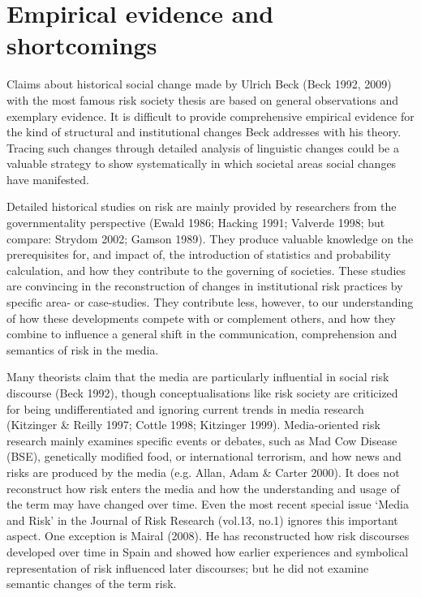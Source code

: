 \section{Empirical evidence and shortcomings}

Claims about historical social change made by Ulrich Beck (Beck 1992, 2009) with the most famous risk society thesis are based on general observations and exemplary evidence. It is difficult to provide comprehensive empirical evidence for the kind of structural and institutional changes Beck addresses with his theory. Tracing such changes through detailed analysis of linguistic changes could be a valuable strategy to show systematically in which societal areas social changes have manifested.

Detailed historical studies on risk are mainly provided by researchers from the governmentality perspective (Ewald 1986; Hacking 1991; Valverde 1998; but compare: Strydom 2002; Gamson 1989). They produce valuable knowledge on the prerequisites for, and impact of, the introduction of statistics and probability calculation, and how they contribute to the governing of societies. These studies are convincing in the reconstruction of changes in institutional risk practices by specific area- or case-studies. They contribute less, however, to our understanding of how these developments compete with or complement others, and how they combine to influence a general shift in the communication, comprehension and semantics of risk in the media.

Many theorists claim that the media are particularly influential in social risk discourse (Beck 1992), though conceptualisations like risk society are criticized for being undifferentiated and ignoring current trends in media research (Kitzinger \& Reilly 1997; Cottle 1998; Kitzinger 1999). Media-oriented risk research mainly examines specific events or debates, such as Mad Cow Disease (BSE), genetically modified food, or international terrorism, and how news and risks are produced by the media (e.g. Allan, Adam \& Carter 2000). It does not reconstruct how risk enters the media and how the understanding and usage of the term may have changed over time. Even the most recent special issue `Media and Risk' in the Journal of Risk Research (vol.13, no.1) ignores this important aspect. One exception is Mairal (2008). He has reconstructed how risk discourses developed over time in Spain and showed how earlier experiences and symbolical representation of risk influenced later discourses; but he did not examine semantic changes of the term risk.

